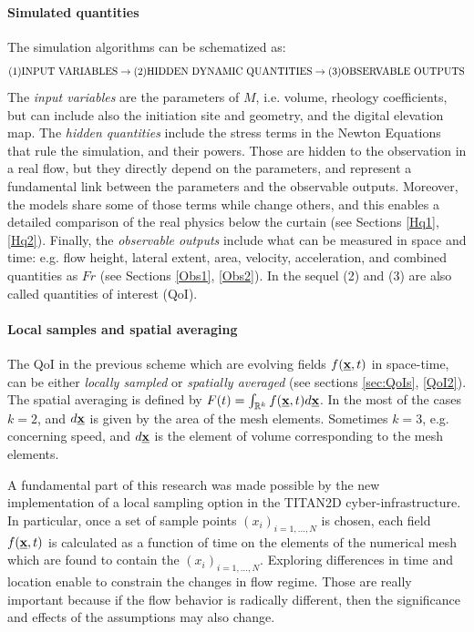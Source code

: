 \documentclass{article}
\begin{document}
\paragraph{Simulated quantities} The simulation algorithms can be schematized as:
$$\textmd{(1)INPUT VARIABLES} \rightarrow \textmd{(2)HIDDEN DYNAMIC QUANTITIES} \rightarrow \textmd{(3)OBSERVABLE OUTPUTS}$$
The \emph{input variables} are the parameters of $M$, i.e. volume, rheology coefficients, but can include also the initiation site and geometry, and the digital elevation map. The \emph{hidden quantities} include the stress terms in the Newton Equations that rule the simulation, and their powers. Those are hidden to the observation in a real flow, but they directly depend on the parameters, and represent a fundamental link between the parameters and the observable outputs. Moreover, the models share some of those terms while change others, and this enables a detailed comparison of the real physics below the curtain (see Sections \ref{Hq1},\ref{Hq2}). Finally, the \emph{observable outputs} include what can be measured in space and time: e.g. flow height, lateral extent, area, velocity, acceleration, and combined quantities as $Fr$ (see Sections \ref{Obs1}, \ref{Obs2}). In the sequel (2) and (3) are also called quantities of interest (QoI).

\paragraph{Local samples and spatial averaging}
The QoI in the previous scheme which are evolving fields $f(\underline{\textbf x},t)$ in space-time, can be either \emph{locally sampled} or \emph{spatially averaged} (see sections \ref{sec:QoIs}, \ref{QoI2}). The spatial averaging is defined by $F(t)=\int_{\mathbb R^k}f(\underline{\textbf x},t) d\underline{\textbf x}$. In the most of the cases $k=2$, and $d\underline{\textbf x}$ is given by the area of the mesh elements. Sometimes $k=3$, e.g. concerning speed, and $d\underline{\textbf x}$ is the element of volume corresponding to the mesh elements.

A fundamental part of this research was made possible by the new implementation of a local sampling option in the TITAN2D cyber-infrastructure. In particular, once a set of sample points $(x_i)_{i=1,...,N}$ is chosen, each field $f(\underline{\textbf x},t)$ is calculated as a function of time on the elements of the numerical mesh which are found to contain the $(x_i)_{i=1,...,N}$. Exploring differences in time and location enable to constrain the changes in flow regime. Those are really important because if the flow behavior is radically different, then the significance and effects of the assumptions may also change.
\end{document}
